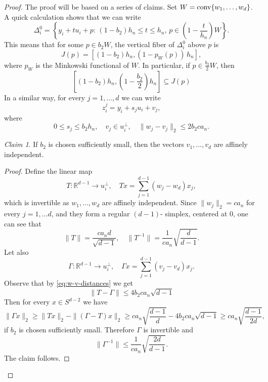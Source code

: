 \documentclass[10pt]{amsart}
\newcommand{\1}{\textbf{1}}
\newcommand{\conv}{{\rm conv}}
\numberwithin{equation}{section} %
\theoremstyle{remark}
\newtheorem{claim}{Claim}
\theoremstyle{definition}
\begin{document}
\begin{proof}

   The proof will be based on a series of claims. Set $W=\conv\{w_1,\ldots,w_d\}$.
    A quick calculation shows that we can write \begin{equation}\label{eq:delta0-alternative-writing}
    \Delta_i^0=\left\{y_i+tu_i+p: \, (1-b_2)h_n \leq t \leq h_n, \, p \in \left(1-\frac{t}{h_n}\right)W\right\}.
    \end{equation}This means that for some $p \in b_2W$, the vertical fiber of $\Delta_i^0$ above $p$ is \[J(p)=[(1-b_2)h_n,(1-p_W(p))\,h_n],\] where $p_W$ is the Minkowski functional of $W$. In particular, if $p \in \frac{b_2}{2}W$, then \begin{equation}\label{eq:fiber-length}
      \left[ (1-b_2)h_n, \left(1-\frac{b_2}{2}\right)h_n \right] \subseteq J(p) 
    \end{equation}
     In a similar way, for every $j=1,\ldots,d$ we can write \[z_i^j=y_i+s_ju_i+v_j,\] where \begin{equation}\label{eq:w-v-distances}
     0 \leq s_j \leq b_2h_n, \quad v_j \in u_i^\perp, \quad \|w_j-v_j\|_2 \leq 2b_2ca_n.
     \end{equation}

     \begin{claim}\label{claim:affine-independence}
         If $b_2$ is chosen sufficiently small, then the vectors $v_1,\ldots,v_d$ are affinely independent.
     \end{claim}

     \begin{proof}
         Define the linear map \[T: \mathbb{R}^{d-1} \to u_i^\perp, \quad Tx=\sum_{j=1}^{d-1}(w_j-w_d)x_j,\] which is invertible as $w_1,\ldots,w_d$ are affinely independent. Since $\|w_j\|_2=ca_n$ for every $j=1,\ldots d$, and they form a regular $(d-1)$- simplex, centered at $0$, one can see that \begin{equation}\label{eq:M-norms}
         \|T\|=\frac{ca_nd}{\sqrt{d-1}}, \quad \|T^{-1}\|=\frac{1}{ca_n}\sqrt{\frac{d}{d-1}}.
         \end{equation}
         Let also \[\Gamma: \mathbb{R}^{d-1} \to u_i^\perp, \quad \Gamma x=\sum_{j=1}^{d-1}(v_j-v_d)x_j.\] Observe that by \eqref{eq:w-v-distances} we get \[\|T-\Gamma\| \leq 4b_2ca_n \sqrt{d-1}\]  Then for every $x \in S^{d-2}$ we have 
         \begin{equation}\label{eq:N-norm-inverse}
         \|\Gamma x\|_2 \geq  \|Tx\|_2-\|(\Gamma-T)x\|_2 \geq ca_n\sqrt{\frac{d-1}{d}}-4b_2ca_n\sqrt{d-1} \geq ca_n \sqrt{\frac{d-1}{2d}},
         \end{equation} if $b_2$ is chosen sufficiently small. Therefore $\Gamma$ is invertible and \begin{equation}\label{eq:N-inverse-norm}
             \|\Gamma^{-1}\| \leq \frac{1}{ca_n} \sqrt{\frac{2d}{d-1}}.
         \end{equation} The claim follows.
     \end{proof}


\end{proof}
\end{document}
